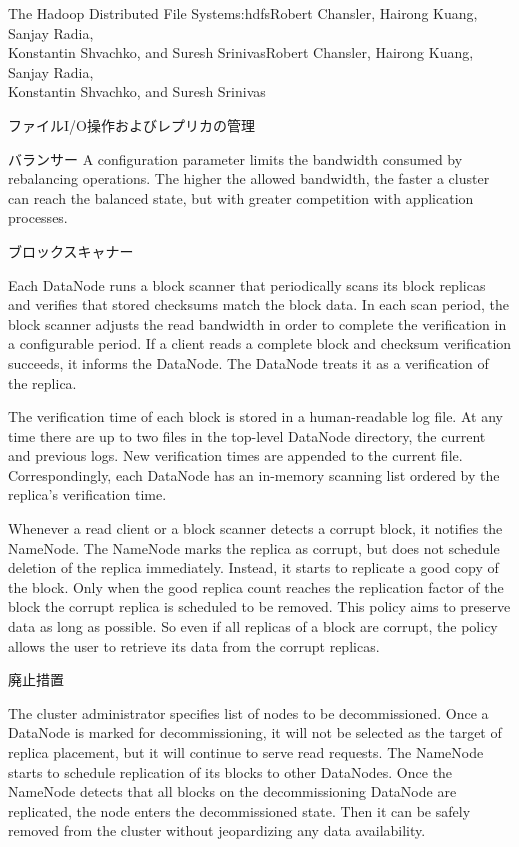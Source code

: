 \begin{aosachaptertoc}{The Hadoop Distributed File System}{s:hdfs}{Robert Chansler, Hairong Kuang, Sanjay Radia, \\ Konstantin Shvachko, and Suresh Srinivas}{Robert Chansler, Hairong Kuang, Sanjay Radia, \\ \hspace*{0.9cm} Konstantin Shvachko, and Suresh Srinivas}
\begin{aosasect1}{ファイルI/O操作およびレプリカの管理}
\begin{aosasect2}{バランサー}
A configuration parameter limits the bandwidth consumed by rebalancing
operations. The higher the allowed bandwidth, the faster a cluster can
reach the balanced state, but with greater competition with
application processes.

\end{aosasect2}

\begin{aosasect2}{ブロックスキャナー}

Each DataNode runs a block scanner that periodically scans its block
replicas and verifies that stored checksums match the block data. In
each scan period, the block scanner adjusts the read bandwidth in
order to complete the verification in a configurable period. If a
client reads a complete block and checksum verification succeeds, it
informs the DataNode. The DataNode treats it as a verification of the
replica.

The verification time of each block is stored in a human-readable log
file. At any time there are up to two files in the top-level DataNode
directory, the current and previous logs. New verification times are
appended to the current file. Correspondingly, each DataNode has an
in-memory scanning list ordered by the replica's verification time.

Whenever a read client or a block scanner detects a corrupt block, it
notifies the NameNode. The NameNode marks the replica as corrupt, but
does not schedule deletion of the replica immediately. Instead, it
starts to replicate a good copy of the block. Only when the good
replica count reaches the replication factor of the block the corrupt
replica is scheduled to be removed. This policy aims to preserve data
as long as possible. So even if all replicas of a block are corrupt,
the policy allows the user to retrieve its data from the corrupt
replicas.

\end{aosasect2}

\begin{aosasect2}{廃止措置}

The cluster administrator specifies list of nodes to be
decommissioned.  Once a DataNode is marked for decommissioning, it
will not be selected as the target of replica placement, but it will
continue to serve read requests. The NameNode starts to schedule
replication of its blocks to other DataNodes. Once the NameNode
detects that all blocks on the decommissioning DataNode are
replicated, the node enters the decommissioned state. Then it can be
safely removed from the cluster without jeopardizing any data
availability.


\end{aosasect2}
\end{aosasect1}
\end{aosachaptertoc}
